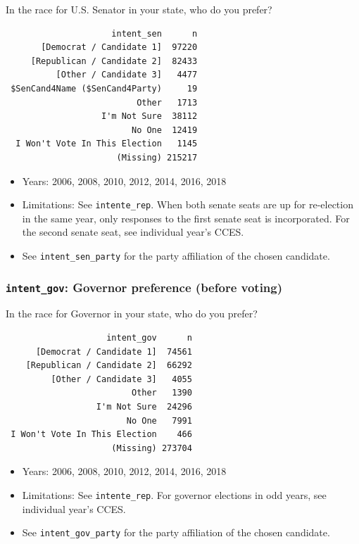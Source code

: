 \documentclass[10pt,article,oneside]{memoir}
\theoremstyle{definition}
\begin{document}
In the race for U.S. Senator in your state, who do you prefer?

\begin{verbatim}
                     intent_sen      n
       [Democrat / Candidate 1]  97220
     [Republican / Candidate 2]  82433
          [Other / Candidate 3]   4477
 $SenCand4Name ($SenCand4Party)     19
                          Other   1713
                   I'm Not Sure  38112
                         No One  12419
  I Won't Vote In This Election   1145
                      (Missing) 215217
\end{verbatim}

\begin{itemize}
\tightlist
\item
  Years: 2006, 2008, 2010, 2012, 2014, 2016, 2018
\item
  Limitations: See \texttt{intente\_rep}. When both senate seats are up
  for re-election in the same year, only responses to the first senate
  seat is incorporated. For the second senate seat, see individual
  year's CCES.
\item
  See \texttt{intent\_sen\_party} for the party affiliation of the
  chosen candidate.
\end{itemize}

\subsubsection{\texorpdfstring{\texttt{intent\_gov}: Governor preference
(before
voting)}{intent\_gov: Governor preference (before voting)}}\label{intent_gov-governor-preference-before-voting}

In the race for Governor in your state, who do you prefer?

\begin{verbatim}
                    intent_gov      n
      [Democrat / Candidate 1]  74561
    [Republican / Candidate 2]  66292
         [Other / Candidate 3]   4055
                         Other   1390
                  I'm Not Sure  24296
                        No One   7991
 I Won't Vote In This Election    466
                     (Missing) 273704
\end{verbatim}

\begin{itemize}
\tightlist
\item
  Years: 2006, 2008, 2010, 2012, 2014, 2016, 2018
\item
  Limitations: See \texttt{intente\_rep}. For governor elections in odd
  years, see individual year's CCES.
\item
  See \texttt{intent\_gov\_party} for the party affiliation of the
  chosen candidate.
\end{itemize}
\end{document}
